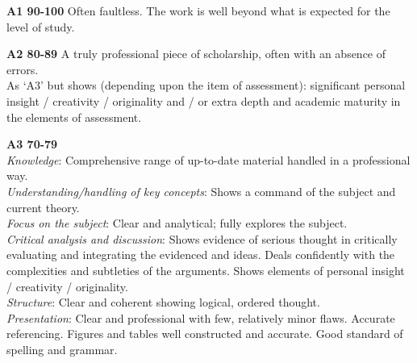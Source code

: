\documentclass[11pt,]{article}
\begin{document}
{\bf A1 90-100}
Often faultless. The work is well beyond what is expected for the level of study.

{\bf A2 80-89}
A truly professional piece of scholarship, often with an absence of errors. \\
As `A3' but shows (depending upon the item of assessment):
significant personal insight / creativity / originality
and / or
extra depth and academic maturity in the elements of assessment.

{\bf A3 70-79}\\
\emph{Knowledge}: Comprehensive range of up-to-date material handled in a professional way.\\
\emph{Understanding/handling of key concepts}: Shows a command of the subject and current theory.\\
\emph{Focus on the subject}: Clear and analytical; fully explores the subject.\\
\emph{Critical analysis and discussion}: Shows evidence of serious thought in critically evaluating and integrating the evidenced and ideas. Deals confidently with the complexities and subtleties of the arguments. Shows elements of personal insight / creativity / originality.\\
\emph{Structure}: Clear and coherent showing logical, ordered thought.\\
\emph{Presentation}: Clear and professional with few, relatively minor flaws. Accurate referencing. Figures and tables well constructed and accurate. Good standard of spelling and grammar.


\end{document}
